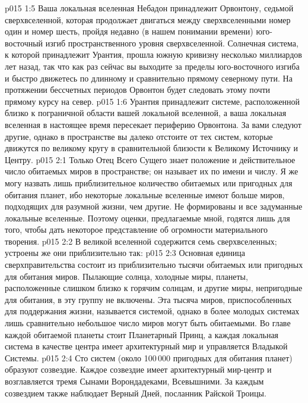 \vs p015 1:5 Ваша локальная вселенная Небадон принадлежит Орвонтону, седьмой сверхвселенной, которая продолжает двигаться между сверхвселенными номер один и номер шесть, пройдя недавно (в нашем понимании времени) юго\hyp{}восточный изгиб пространственного уровня сверхвселенной. Солнечная система, к которой принадлежит Урантия, прошла южную кривизну несколько миллиардов лет назад, так что как раз сейчас вы выходите за пределы юго\hyp{}восточного изгиба и быстро движетесь по длинному и сравнительно прямому северному пути. На протяжении бессчетных периодов Орвонтон будет следовать этому почти прямому курсу на север.
\vs p015 1:6 Урантия принадлежит системе, расположенной близко к пограничной области вашей локальной вселенной, а ваша локальная вселенная в настоящее время пересекает периферию Орвонтона. За вами следуют другие, однако в пространстве вы далеко отстоите от тех систем, которые движутся по великому кругу в сравнительной близости к Великому Источнику и Центру.
\vs p015 2:1 Только Отец Всего Сущего знает положение и действительное число обитаемых миров в пространстве; он называет их по имени и числу. Я же могу назвать лишь приблизительное количество обитаемых или пригодных для обитания планет, ибо некоторые локальные вселенные имеют больше миров, подходящих для разумной жизни, чем другие. Не формированы и все задуманные локальные вселенные. Поэтому оценки, предлагаемые мной, годятся лишь для того, чтобы дать некоторое представление об огромности материального творения.
\vs p015 2:2 \pc В великой вселенной содержится семь сверхвселенных; устроены же они приблизительно так:
\vs p015 2:3 \bibnobreakspace {} Основная единица сверхправительства состоит из приблизительно тысячи обитаемых или пригодных для обитания миров. Пылающие солнца, холодные миры, планеты, расположенные слишком близко к горячим солнцам, и другие миры, непригодные для обитания, в эту группу не включены. Эта тысяча миров, приспособленных для поддержания жизни, называется системой, однако в более молодых системах лишь сравнительно небольшое число миров могут быть обитаемыми. Во главе каждой обитаемой планеты стоит Планетарный Принц, а каждая локальная система в качестве центра имеет архитектурный мир и управляется Владыкой Системы.
\vs p015 2:4 \bibnobreakspace {} Сто систем (около 100\,000 пригодных для обитания планет) образуют созвездие. Каждое созвездие имеет архитектурный мир\hyp{}центр и возглавляется тремя Сынами Ворондадеками, Всевышними. За каждым созвездием также наблюдает Верный Дней, посланник Райской Троицы.
